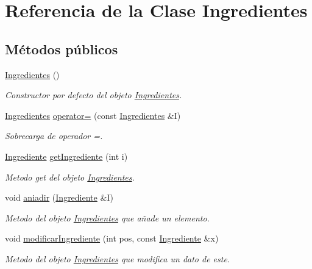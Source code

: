 \hypertarget{classIngredientes}{}\section{Referencia de la Clase Ingredientes}
\label{classIngredientes}
\subsection*{Métodos públicos}
\begin{DoxyCompactItemize}
\item 
\hyperlink{classIngredientes_a4599533b7d0530fe6fdd68006b3f0bde}{Ingredientes} ()
\begin{DoxyCompactList}\small\item\em Constructor por defecto del objeto \hyperlink{classIngredientes}{Ingredientes}. \end{DoxyCompactList}\item 
\hyperlink{classIngredientes}{Ingredientes} \hyperlink{classIngredientes_a62ad2bb49e19ce82df5d04fe94081e9c}{operator=} (const \hyperlink{classIngredientes}{Ingredientes} \&I)
\begin{DoxyCompactList}\small\item\em Sobrecarga de operador =. \end{DoxyCompactList}\item 
\hyperlink{classIngrediente}{Ingrediente} \hyperlink{classIngredientes_a561c8183bb25088863c6532a486021ea}{get\+Ingrediente} (int i)
\begin{DoxyCompactList}\small\item\em Metodo get del objeto \hyperlink{classIngredientes}{Ingredientes}. \end{DoxyCompactList}\item 
void \hyperlink{classIngredientes_a43faff99202867d2360a6774f3cd7c12}{aniadir} (\hyperlink{classIngrediente}{Ingrediente} \&I)
\begin{DoxyCompactList}\small\item\em Metodo del objeto \hyperlink{classIngredientes}{Ingredientes} que añade un elemento. \end{DoxyCompactList}\item 
void \hyperlink{classIngredientes_a21f6b5fff2fdb3c0eb89bde2d08d07a6}{modificar\+Ingrediente} (int pos, const \hyperlink{classIngrediente}{Ingrediente} \&x)
\begin{DoxyCompactList}\small\item\em Metodo del objeto \hyperlink{classIngredientes}{Ingredientes} que modifica un dato de este. \end{DoxyCompactList}\item 

\end{DoxyCompactItemize}
